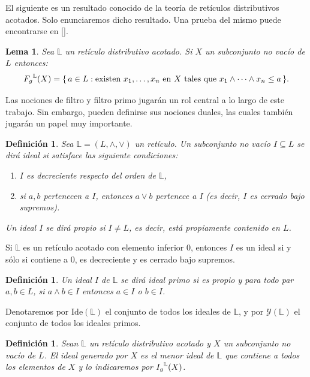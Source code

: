 \documentclass[12pt]{book}
\newtheorem{lemma}[theorem]{Lema}
\newtheorem{definition}[theorem]{Definición}
\newcommand{\Fg}{\mathnormal{F_g}}
\newcommand{\Ig}{\mathnormal{I_g}}
\begin{document}
El siguiente es un resultado conocido de la teoría de retículos distributivos acotados. Solo enunciaremos dicho resultado. Una prueba del mismo puede encontrarse en [{\cite[Lema~2.4.5]{SS}}].


\begin{lemma}\label{lem:filtro_generado}
Sea \( \mathbb{L} \) un retículo distributivo acotado.  Si \( X \) un subconjunto no vacío de \( L \) entonces: 
\[
\Fg^{\mathbb{L}}(X)
   = \{\, a \in L :
        \text{existen } x_{1},\dots,x_{n}\text{ en }X
        \text{ tales que } x_{1}\wedge\dots\wedge x_{n} \le a \,\}.
\]
\end{lemma}

Las nociones de filtro y filtro primo jugarán un rol central a lo largo de este trabajo. Sin embargo, pueden definirse sus nociones duales, las cuales también jugarán un papel muy importante.

\begin{definition}\label{def:ideal}
Sea \( \mathbb{L}=(L,\wedge,\vee) \) un retículo. Un subconjunto no vacío \( I \subseteq L \) se dirá \emph{ideal} si satisface las siguiente condiciones:
\begin{enumerate}[\normalfont (1)]
  \item \( I \) es decreciente respecto del orden de \( \mathbb{L} \),
  \item si \( a,b \) pertenecen a \( I \), entonces \( a\vee b \) pertenece a \( I \)
        (es decir, \( I \) es cerrado bajo supremos).
\end{enumerate}
Un ideal \( I \) se dirá \emph{propio} si $I \neq L$, es decir, está propiamente contenido en $L$.
\end{definition}

Si \( \mathbb{L} \) es un retículo acotado con elemento inferior \( 0 \),
entonces \( I \) es un ideal si y sólo si contiene a \( 0 \), es decreciente
y es cerrado bajo supremos.

\begin{definition}
Un ideal \(  I \) de \( \mathbb{L} \) se dirá \emph{ideal primo}
si es propio y para todo par \( a,b \in L \),
si \( a\wedge b \in I \) entonces  \( a \in I \) o \( b \in I \).
\end{definition}

Denotaremos por \( \mathrm{Ide}(\mathbb{L}) \) el conjunto de todos los ideales de \( \mathbb{L} \),
y por \( \mathcal{Y}(\mathbb{L}) \) el conjunto de todos los ideales primos.

\begin{definition} Sean \( \mathbb{L} \) un retículo distributivo acotado 
y  \( X \) un subconjunto no vacío de \( L \). El \emph{ideal generado por \( X \)} es el menor ideal de $\mathbb{L}$ que contiene a todos los elementos de \( X \) y lo indicaremos por \( \Ig^{\mathbb{L}}(X) \).
\end{definition}
\end{document}

